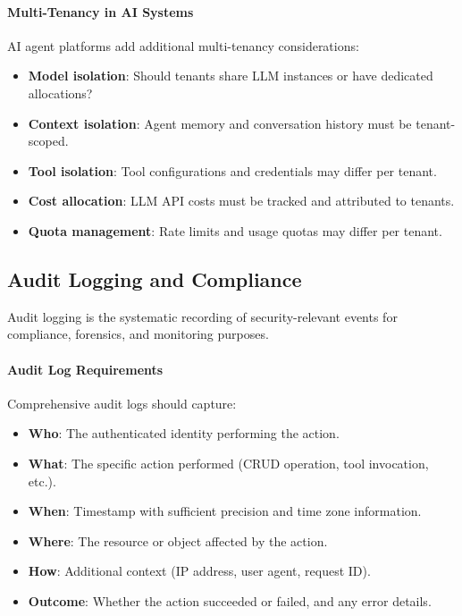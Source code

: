 \paragraph{Multi-Tenancy in AI Systems}

AI agent platforms add additional multi-tenancy considerations:

\begin{itemize}
    \item \textbf{Model isolation}: Should tenants share LLM instances or have dedicated allocations?
    \item \textbf{Context isolation}: Agent memory and conversation history must be tenant-scoped.
    \item \textbf{Tool isolation}: Tool configurations and credentials may differ per tenant.
    \item \textbf{Cost allocation}: LLM API costs must be tracked and attributed to tenants.
    \item \textbf{Quota management}: Rate limits and usage quotas may differ per tenant.
\end{itemize}

\subsection{Audit Logging and Compliance}

Audit logging is the systematic recording of security-relevant events for compliance, forensics, and monitoring purposes.

\paragraph{Audit Log Requirements}

Comprehensive audit logs should capture:

\begin{itemize}
    \item \textbf{Who}: The authenticated identity performing the action.
    \item \textbf{What}: The specific action performed (CRUD operation, tool invocation, etc.).
    \item \textbf{When}: Timestamp with sufficient precision and time zone information.
    \item \textbf{Where}: The resource or object affected by the action.
    \item \textbf{How}: Additional context (IP address, user agent, request ID).
    \item \textbf{Outcome}: Whether the action succeeded or failed, and any error details.
\end{itemize}


